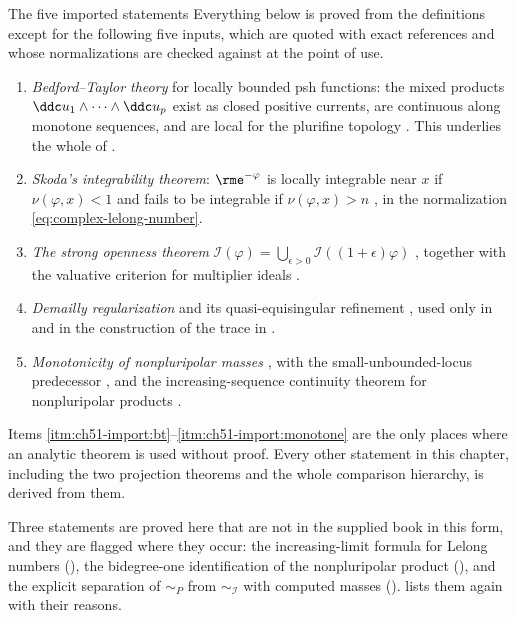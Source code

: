 \begin{important}{The five imported statements}
\label{imp:ch51-imported}
Everything below is proved from the definitions except for the following
five inputs, which are quoted with exact references and whose
normalizations are checked against  at the
point of use.
\begin{enumerate}
\item\label{itm:ch51-import:bt}
      \emph{Bedford--Taylor theory} for locally bounded psh functions:
      the mixed products \(\ddc u_1\wedge\cdots\wedge\ddc u_p\) exist as
      closed positive currents, are continuous along monotone sequences,
      and are local for the plurifine topology
      \cite{BT76,BT82}.  This underlies the whole of
      .
\item\label{itm:ch51-import:skoda}
      \emph{Skoda's integrability theorem}: \(\rme^{-\varphi}\) is locally
      integrable near \(x\) if \(\nu(\varphi,x)<1\) and fails to be
      integrable if \(\nu(\varphi,x)>n\) \cite{Sko72}, in the
      normalization \eqref{eq:complex-lelong-number}.
\item\label{itm:ch51-import:openness}
      \emph{The strong openness theorem}
      \(\mathcal I(\varphi)=\bigcup_{\epsilon>0}\mathcal I((1+\epsilon)\varphi)\)
      \cite[Theorem~1.1]{GZ15}, together with the valuative criterion for
      multiplier ideals \cite[Corollary~10.18]{Bou17}.
\item\label{itm:ch51-import:regularization}
      \emph{Demailly regularization} and its quasi-equisingular refinement
      \cite{Dem92reg,DPS01}, used only in
       and in the construction of
      the trace in .
\item\label{itm:ch51-import:monotone}
      \emph{Monotonicity of nonpluripolar masses}
      \cite[Theorem~1.1]{DDNL18mono}, with the small-unbounded-locus
      predecessor \cite[Theorem~1.16]{BEGZ10}, and the increasing-sequence
      continuity theorem for nonpluripolar products
      \cite[Theorem~2.3]{DDNL18mono}.
\end{enumerate}
Items \cref{itm:ch51-import:bt}--\cref{itm:ch51-import:monotone} are the
only places where an analytic theorem is used without proof.  Every other
statement in this chapter, including the two projection theorems and the
whole comparison hierarchy, is derived from them.
\end{important}

Three statements are proved here that are not in the supplied book in this
form, and they are flagged where they occur: the increasing-limit formula
for Lelong numbers (), the bidegree-one
identification of the nonpluripolar product
(), and the explicit separation of
\(\sim_P\) from \(\sim_{\mathcal I}\) with computed masses
().   lists them again with
their reasons.

